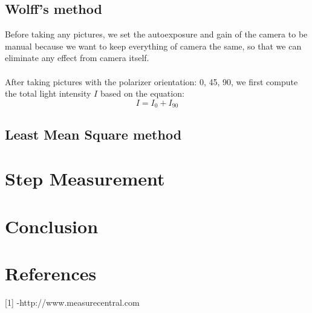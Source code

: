 \documentclass[english]{article}
\begin{document}
\subsection{Wolff's method}
Before taking any pictures, we set the autoexposure and gain of the camera to be manual because we want to keep everything of camera the same, so that we can eliminate any effect from camera itself.\\
\\
After taking pictures with the polarizer orientation: 0\textdegree, 45\textdegree, 90\textdegree, we first compute the total light intensity $I$ based on the equation:
$$
I = I_{0} + I_{90}
$$

\subsection{Least Mean Square method}

\section{Step Measurement}


\section{Conclusion}

\section{References}

{[}1{]} -http://www.measurecentral.com
\end{document}

